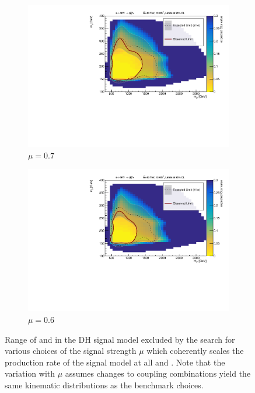 \begin{figure}[h]
\begin{subfigure}{0.48\textwidth}
    \includegraphics[width=\textwidth]{Figures/App_signal_strength/unblinded_mu0_7_nosig.pdf}
    \caption{\(\mu=0.7\)}\label{fig:unblinded_0.7}
  \end{subfigure} \hspace{0.3em}
  \begin{subfigure}{0.48\textwidth}
    \includegraphics[width=\textwidth]{Figures/App_signal_strength/unblinded_mu0_6_nosig.pdf}
    \caption{\(\mu=0.6\)}\label{fig:unblinded_0.6}
  \end{subfigure}
  \caption[Range of \ms and \mZp in the Dark Higgs signal model excluded by the search for various choices of the signal strength \(\mu\).]{Range of \ms and \mZp in the DH signal model excluded by the search for various choices of the signal strength \(\mu\) which coherently scales the production rate of the signal model at all \ms and \mZp. Note that the variation with \(\mu\) assumes changes to coupling combinations yield the same kinematic distributions as the benchmark choices.}
  \label{fig:limits_vary_mu_sig}
\end{figure}

